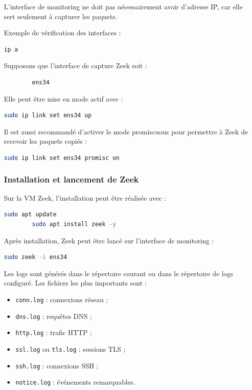 \documentclass[12pt,a4paper,oneside]{report}
\begin{document}
	L'interface de monitoring ne doit pas nécessairement avoir d'adresse IP, car elle sert seulement à capturer les paquets.
	
	Exemple de vérification des interfaces :
	
	\begin{lstlisting}[language=bash]
		ip a
	\end{lstlisting}
	
	Supposons que l'interface de capture Zeek soit :
	
	\begin{lstlisting}
		ens34
	\end{lstlisting}
	
	Elle peut être mise en mode actif avec :
	
	\begin{lstlisting}[language=bash]
		sudo ip link set ens34 up
	\end{lstlisting}
	
	Il est aussi recommandé d'activer le mode promiscuous pour permettre à Zeek de recevoir les paquets copiés :
	
	\begin{lstlisting}[language=bash]
		sudo ip link set ens34 promisc on
	\end{lstlisting}
	
	\subsubsection{Installation et lancement de Zeek}
	
	Sur la VM Zeek, l'installation peut être réalisée avec :
	
	\begin{lstlisting}[language=bash]
		sudo apt update
		sudo apt install zeek -y
	\end{lstlisting}
	
	Après installation, Zeek peut être lancé sur l'interface de monitoring :
	
	\begin{lstlisting}[language=bash]
		sudo zeek -i ens34
	\end{lstlisting}
	
	Les logs sont générés dans le répertoire courant ou dans le répertoire de logs configuré. Les fichiers les plus importants sont :
	
	\begin{itemize}
		\item \texttt{conn.log} : connexions réseau ;
		\item \texttt{dns.log} : requêtes DNS ;
		\item \texttt{http.log} : trafic HTTP ;
		\item \texttt{ssl.log} ou \texttt{tls.log} : sessions TLS ;
		\item \texttt{ssh.log} : connexions SSH ;
		\item \texttt{notice.log} : événements remarquables.
	\end{itemize}
	
\end{document}
